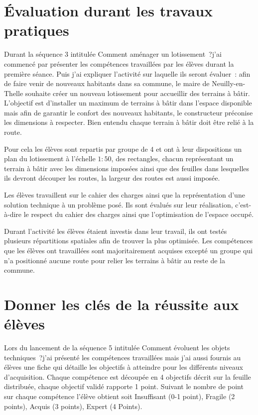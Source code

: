 

\section{Évaluation durant les travaux pratiques}

Durant la séquence 3 intitulée \og Comment aménager un lotissement~?\fg j'ai commencé par présenter les compétences travaillées par les élèves durant la première séance.
Puis j'ai expliquer l'activité sur laquelle ils seront évaluer~: afin de faire venir de nouveaux habitants dans sa commune, le maire de Neuilly-en-Thelle souhaite créer un nouveau lotissement pour accueillir des terrains à bâtir.
L'objectif est d'installer un maximum de terrains à bâtir dans l'espace disponible mais afin de garantir le confort des nouveaux habitants, le constructeur préconise les dimensions à respecter.
Bien entendu chaque terrain à bâtir doit être relié à la route.

Pour cela les élèves sont repartis par groupe de 4 et ont à leur dispositions un plan du lotissement à l'échelle $1:50$, des rectangles, chacun représentant un terrain à bâtir avec les dimensions imposées ainsi que des feuilles dans lesquelles ils devront découper les routes, la largeur des routes est aussi imposée.

Les élèves travaillent sur le cahier des charges ainsi que la représentation d'une solution technique à un problème posé.
Ils sont évalués sur leur réalisation, c'est-à-dire le respect du cahier des charges ainsi que l'optimisation de l'espace occupé.

Durant l'activité les élèves étaient investis dans leur travail, ils ont testés plusieurs répartitions spatiales afin de trouver la plus optimisée.
Les compétences que les élèves ont travaillées sont majoritairement acquises excepté un groupe qui n'a positionné aucune route pour relier les terrains à bâtir au reste de la commune.



\section{Donner les clés de la réussite aux élèves}

Lors du lancement de la séquence 5 intitulée \og Comment évoluent les objets techniques~?\fg j'ai présenté les compétences travaillées mais j'ai aussi fournis au élèves une fiche qui détaille les objectifs à atteindre pour les différents niveaux d'acquisition. 
Chaque compétence est découpée en 4 objectifs décrit sur la feuille distribuée, chaque objectif validé rapporte 1 point. Suivant le nombre de point sur chaque compétence l'élève obtient soit Insuffisant (0-1 point), Fragile (2 points), Acquis (3 points), Expert (4 Points).

